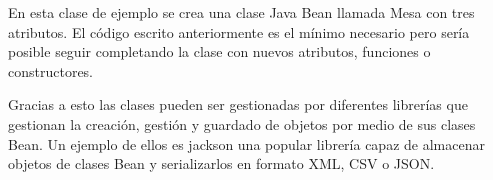 En esta clase de ejemplo se crea una clase Java Bean llamada Mesa con tres atributos. El código escrito anteriormente es el mínimo necesario pero sería posible seguir completando la clase con nuevos atributos, funciones o constructores.

Gracias a esto las clases pueden ser gestionadas por diferentes librerías que gestionan la creación, gestión y guardado de objetos por medio de sus clases Bean. Un ejemplo de ellos es jackson una popular librería capaz de almacenar objetos de clases Bean y serializarlos en formato XML, CSV o JSON.



